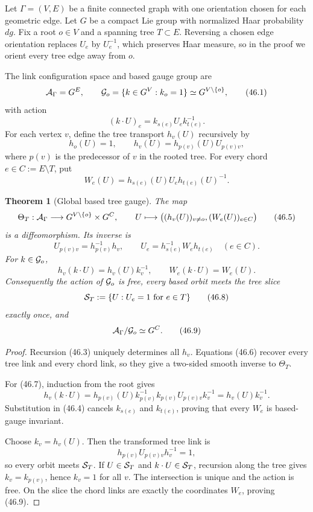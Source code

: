 \documentclass[11pt]{article}
\newtheorem{theorem}{Theorem}[section]
\begin{document}
Let \(\Gamma=(V,E)\) be a finite connected graph with one orientation
chosen for each geometric edge.  Let \(G\) be a compact Lie group with
normalized Haar probability \(dg\).  Fix a root \(o\in V\) and a
spanning tree \(T\subset E\).  Reversing a chosen edge orientation
replaces \(U_e\) by \(U_e^{-1}\), which preserves Haar measure, so in
the proof we orient every tree edge away from \(o\).

The link configuration space and based gauge group are
\[
 {\cal A}_\Gamma=G^E,\qquad
 {\cal G}_o=\{k\in G^V:k_o=1\}\simeq G^{V\setminus\{o\}},       \tag{46.1}
\]
with action
\[
                    (k\cdot U)_e=k_{s(e)}U_e k_{t(e)}^{-1}.   \tag{46.2}
\]
For each vertex \(v\), define the tree transport \(h_v(U)\) recursively
by
\[
 h_o(U)=1,\qquad h_v(U)=h_{p(v)}(U)U_{p(v)v},                 \tag{46.3}
\]
where \(p(v)\) is the predecessor of \(v\) in the rooted tree.
For every chord \(e\in C:=E\setminus T\), put
\[
                W_e(U)=h_{s(e)}(U)U_eh_{t(e)}(U)^{-1}.        \tag{46.4}
\]

\begin{theorem}[Global based tree gauge]
\label{thm:v11v46-global-tree}
The map
\[
 \Theta_T:{\cal A}_\Gamma\longrightarrow
           G^{V\setminus\{o\}}\times G^C,\qquad
 U\longmapsto\bigl((h_v(U))_{v\ne o},(W_e(U))_{e\in C}\bigr)  \tag{46.5}
\]
is a diffeomorphism.  Its inverse is
\[
 U_{p(v)v}=h_{p(v)}^{-1}h_v,\qquad
 U_e=h_{s(e)}^{-1}W_eh_{t(e)}\quad(e\in C).                   \tag{46.6}
\]
For \(k\in{\cal G}_o\),
\[
 h_v(k\cdot U)=h_v(U)k_v^{-1},\qquad
 W_e(k\cdot U)=W_e(U).                                       \tag{46.7}
\]
Consequently the action of \({\cal G}_o\) is free, every based orbit
meets the tree slice
\[
                 {\cal S}_T:=\{U:U_e=1\text{ for }e\in T\}    \tag{46.8}
\]
exactly once, and
\[
                    {\cal A}_\Gamma/{\cal G}_o\simeq G^C.     \tag{46.9}
\]
\end{theorem}

\begin{proof}
Recursion (46.3) uniquely determines all \(h_v\).  Equations (46.6)
recover every tree link and every chord link, so they give a two-sided
smooth inverse to \(\Theta_T\).

For (46.7), induction from the root gives
\[
 h_v(k\cdot U)
 =h_{p(v)}(U)k_{p(v)}^{-1}
   k_{p(v)}U_{p(v)v}k_v^{-1}
 =h_v(U)k_v^{-1}.
\]
Substitution in (46.4) cancels \(k_{s(e)}\) and \(k_{t(e)}\), proving
that every \(W_e\) is based-gauge invariant.

Choose \(k_v=h_v(U)\).  Then the transformed tree link is
\[
 h_{p(v)}U_{p(v)v}h_v^{-1}=1,
\]
so every orbit meets \({\cal S}_T\).  If \(U\in{\cal S}_T\) and
\(k\cdot U\in{\cal S}_T\), recursion along the tree gives
\(k_v=k_{p(v)}\), hence \(k_v=1\) for all \(v\).  The intersection is
unique and the action is free.  On the slice the chord links are
exactly the coordinates \(W_e\), proving (46.9).
\end{proof}
\end{document}
